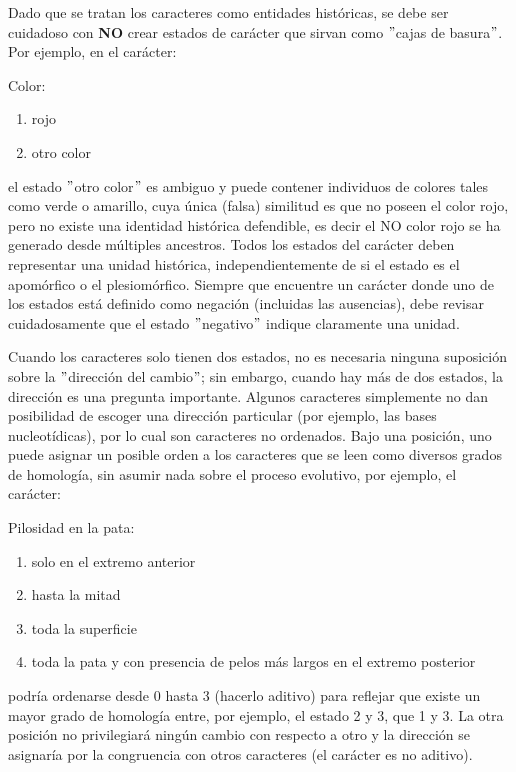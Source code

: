 Dado que se tratan los caracteres como entidades hist\'oricas, se 
debe ser cuidadoso con \textbf{NO} crear estados de car\'acter que 
sirvan como $"$cajas de basura$"$. Por ejemplo, en el car\'acter: 

\begin{small}
Color: 
	\begin{enumerate}[start=0]
		\item rojo
		\item otro color
	\end{enumerate}	
\end{small}
 

el estado $"$otro color$"$ es ambiguo y puede contener individuos de 
colores tales como verde o amarillo, cuya \'unica (falsa)  similitud es 
que no poseen el color rojo, pero no existe una identidad hist\'orica 
defendible, es decir el NO color rojo se ha  generado desde m\'ultiples 
ancestros. Todos los estados del car\'acter deben representar una 
unidad hist\'orica, independientemente de si el estado es el 
apom\'orfico o el plesiom\'orfico. Siempre que encuentre un car\'acter 
donde uno de los estados est\'a definido como negaci\'on (incluidas las 
ausencias), debe revisar cuidadosamente que el estado $"$negativo$"$ 
indique claramente una unidad.


Cuando los caracteres solo tienen dos estados, no es necesaria ninguna 
suposici\'on sobre la $"$direcci\'on del cambio$"$; sin embargo, cuando 
hay m\'as de dos estados, la direcci\'on es una pregunta importante. 
Algunos caracteres simplemente no dan posibilidad de escoger una 
direcci\'on particular (por ejemplo, las bases nucleot\'idicas), por lo 
cual son caracteres no ordenados. Bajo una posici\'on,  uno puede 
asignar un posible orden a los caracteres que se leen como diversos 
grados de homolog\'ia, sin asumir nada sobre el proceso evolutivo, por 
ejemplo, el car\'acter: 

\begin{small}
Pilosidad en la pata: 
	\begin{enumerate}[start=0]
		\item solo en el extremo anterior
		\item hasta la mitad
		\item toda la superficie
		\item toda la pata y con presencia de pelos m\'as largos en el extremo posterior
	\end{enumerate}	
\end{small}

podr\'ia ordenarse desde 0 hasta 3 (hacerlo aditivo) para reflejar que 
existe un mayor grado de homolog\'ia entre, por ejemplo, el estado 2 y 
3, que 1 y 3. La otra posici\'on no privilegiar\'a ning\'un cambio con 
respecto a otro y la direcci\'on se asignar\'ia por la congruencia con 
otros caracteres (el car\'acter es no aditivo).


